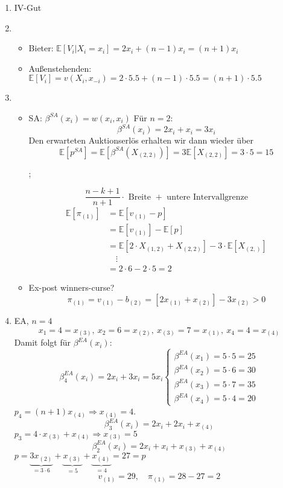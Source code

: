 \documentclass[12pt]{extreport} %
\theoremstyle{named}
\theoremstyle{itshape}
\theoremstyle{normal}
\begin{document}
\begin{enumerate}
	\item IV-Gut
	\item ~\\
	 \begin{itemize}
		\item Bieter: $\mathds{E}[V_{i} \big| X_{i} = x_{i}] = 2 x_{i} + (n-1) x_{i} = (n+1) x_{i}$
		\item Außenstehenden: $\mathds{E}[V_{i}] = v(X_{i}, x_{-i}) = 2 \cdot 5.5 + (n-1) \cdot 5.5 = (n+1) \cdot 5.5$
	\end{itemize}
	\item ~\\
		\begin{itemize}
			\item SA: $\beta^{SA}(x_{i}) = w(x_{i}, x_{i})$ Für $n = 2$:
				$$ \beta^{SA}(x_{i}) = 2x_{i} + x_{i} = 3x_{i} $$
			Den erwarteten Auktionserlös erhalten wir dann wieder über
				$$ \mathds{E}\left[ p^{SA} \right] = \mathds{E}\left[ \beta^{SA}(X_{(2,2)}) \right] = 3 \mathds{E}\left[ X_{(2,2)} \right] = 3 \cdot 5 = 15  $$
			\begin{figure*}
				;
			\end{figure*}
    				$$ \frac{n-k + 1}{n + 1} \cdot \text{ Breite } + \text{ untere Intervallgrenze} $$	
    		\begin{align*}
    			\mathds{E}[\pi_{(1)}] & = \mathds{E}[v_{(1)} - p]  \\
    			& = \mathds{E}[v_{(1)}]  - \mathds{E}[p]  \\
    			& = \mathds{E}[2 \cdot X_{(1,2)} + X_{(2,2)}]  - 3 \cdot \mathds{E}[ X_{(2,)} ]  \\
    			& \quad \vdots \\
    			& = 2 \cdot 6 - 2 \cdot 5 = 2
    		\end{align*}
			\item Ex-post winners-curse?
				$$ \pi_{(1)} = v_{(1)} - b_{(2)} = \left[ 2 x_{(1)} + x_{(2)} \right] - 3 x_{(2)} > 0 $$
		\end{itemize}
	\item EA, $n=4$
		$$ x_1 = 4 = x_{(3)}, ~x_2 = 6 = x_{(2)}, ~x_{(3)} = 7 = x_{(1)}, ~x_{4} = 4 = x_{(4)} $$
		Damit folgt für $\beta^{EA}(x_{i})$:
		$$ \beta_{4}^{EA}(x_{i}) = 2x_{i} + 3 x_{i} = 5 x_{i} \begin{cases}
			\beta^{EA}(x_{1}) = 5 \cdot 5 = 25 \\ \beta^{EA}(x_{2}) = 5 \cdot 6 = 30 \\ \beta^{EA}(x_{3}) = 5 \cdot 7 = 35 \\ \beta^{EA}(x_{4}) = 5 \cdot 4 = 20  
		\end{cases} $$
		$p_4 = (n+1) x_{(4)} \Rightarrow x_{(4)} = 4$.
			$$ \beta_{3}^{EA}(x_{i}) = 2 x_{i} + 2x_{i} + x_{(4)} $$
		$p_3 = 4 \cdot x_{(3)} + x_{(4)} \Rightarrow x_{(3)} = 5$
			$$ \beta_{2}^{EA}(x_{i}) = 2 x_{i} + x_{i} + x_{(3)} + x_{(4)} $$
		$p = \underbrace{3 x_{(2)}}_{= 3 \cdot 6} +  \underbrace{x_{(3)}}_{= 5} +  \underbrace{x_{(4)}}_{= 4} = 27 = p$
		$$ v_{(1)} = 29, \quad  \pi_{(1)} = 28 - 27 = 2 $$
\end{enumerate}
\end{document}
